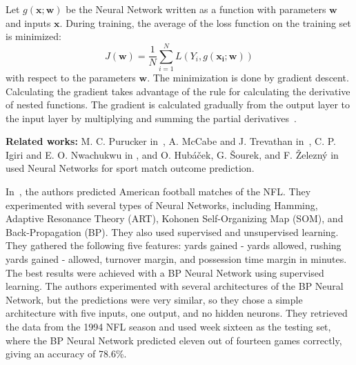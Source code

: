 \documentclass[thesis=M,english]{FITthesis}[2019/12/23]
\begin{document}
Let $g(\boldsymbol{x};\boldsymbol{w})$ be the Neural Network written as a function with parameters $\boldsymbol{w}$ and inputs $\boldsymbol{x}$. During training, the average of the loss function on the training set is minimized: $$J(\boldsymbol{w}) = \frac{1}{N}\sum_{i = 1}^N L(Y_i, g(\boldsymbol{x_i};\boldsymbol{w}))$$ with respect to the parameters $\boldsymbol{w}$. The minimization is done by gradient descent. Calculating the gradient takes advantage of the rule for calculating the derivative of nested functions. The gradient is calculated gradually from the output layer to the input layer by multiplying and summing the partial derivatives~\cite{nn}.

\noindent \textbf{Related works:} M. C. Purucker in~\cite{NFL_first_study}, A. McCabe and J. Trevathan in~\cite{NN_more_sports}, C. P. Igiri and E. O. Nwachukwu in \cite{BPL_ANN_logistic_regression}, and O. Hubáček, G. Šourek, and F. Železný in \cite{NBA_convolution} used Neural Networks for sport match outcome prediction.

In~\cite{NFL_first_study}, the authors predicted American football matches of the NFL. They experimented with several types of Neural Networks, including Hamming, Adaptive Resonance Theory (ART), Kohonen Self-Organizing Map (SOM), and Back-Propagation (BP). They also used supervised and unsupervised learning. They gathered the following five features: yards gained - yards allowed, rushing yards gained - allowed, turnover margin, and possession time margin in minutes. The best results were achieved with a BP Neural Network using supervised learning. The authors experimented with several architectures of the BP Neural Network, but the predictions were very similar, so they chose a simple architecture with five inputs, one output, and no hidden neurons. They retrieved the data from the 1994 NFL season and used week sixteen as the testing set, where the BP Neural Network predicted eleven out of fourteen games correctly, giving an accuracy of 78.6\%.
\end{document}
